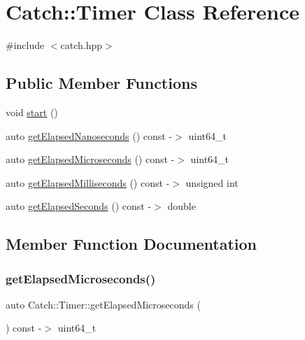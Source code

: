 \hypertarget{class_catch_1_1_timer}{}\section{Catch\+:\+:Timer Class Reference}
\label{class_catch_1_1_timer}


{\ttfamily \#include $<$catch.\+hpp$>$}

\subsection*{Public Member Functions}
\begin{DoxyCompactItemize}
\item 
void \mbox{\hyperlink{class_catch_1_1_timer_a0a56e879e43f36c102bf9ea8b5fc8b72}{start}} ()
\item 
auto \mbox{\hyperlink{class_catch_1_1_timer_a57be5d17ca868a2d6fb1eea84de665cf}{get\+Elapsed\+Nanoseconds}} () const -\/$>$ uint64\+\_\+t
\item 
auto \mbox{\hyperlink{class_catch_1_1_timer_a545de17a61a6fee1dbe3de5b0723e5fa}{get\+Elapsed\+Microseconds}} () const -\/$>$ uint64\+\_\+t
\item 
auto \mbox{\hyperlink{class_catch_1_1_timer_a30aaf458dbb59dd8ac8971c9c62e0eac}{get\+Elapsed\+Milliseconds}} () const -\/$>$ unsigned int
\item 
auto \mbox{\hyperlink{class_catch_1_1_timer_a065e37e3c9eb16bd4dcf41971d8deedc}{get\+Elapsed\+Seconds}} () const -\/$>$ double
\end{DoxyCompactItemize}


\subsection{Member Function Documentation}
\mbox{\label{class_catch_1_1_timer_a545de17a61a6fee1dbe3de5b0723e5fa}} 
\subsubsection{\texorpdfstring{get\+Elapsed\+Microseconds()}{getElapsedMicroseconds()}}
{\footnotesize\ttfamily auto Catch\+::\+Timer\+::get\+Elapsed\+Microseconds (\begin{DoxyParamCaption}{ }\end{DoxyParamCaption}) const -\/$>$  uint64\+\_\+t}

